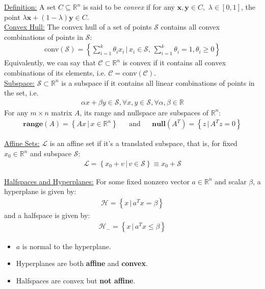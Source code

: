 \documentclass{article}
\newcommand{\sheader}[1]{\underline{#1:}}
\newcommand{\gap}{\medskip\\}
\newcommand{\curly}[1]{\left\{#1\right\}}
\begin{document}
\sheader{Definition} A set $C \subseteq \mathbb{R}^n$ is said to be \textit{convex} if for 
any $\mathbf{x}, \mathbf{y} \in C,\,\, \lambda \in [0, 1]$, the point 
$\lambda \mathbf{x} + (1-\lambda)\mathbf{y}\in C$.
\gap
\sheader{Convex Hull} The convex hull of a set of points $\mathcal{S}$
contains all convex combinations of points in $\mathcal{S}$:
\begin{align*}
    \textrm{conv}(\mathcal{S}) = \curly{\sum_{i=1}^k \theta_i x_i \,|\, x_i \in \mathcal{S}, \, \sum_{i = 1}^k \theta_i = 1, \theta_i \geq 0}
\end{align*}
Equivalently, we can say that $\mathcal{C} \subset \mathbb{R}^n$ is 
convex if it contains all convex combinations of its elements, i.e. 
$\mathcal{C} = \textrm{conv}(\mathcal{C})$.
\gap
\sheader{Subspace} $\mathcal{S} \subset \mathbb{R}^n$ is a subspace 
if it contains all linear combinations of points in the set, i.e.
\begin{align*}
    \alpha x + \beta y \in \mathcal{S}, \forall x, y \in \mathcal{S}, \forall \alpha, \beta \in \mathbb{R}
\end{align*}
For any $m \times n$ matrix $A$, its range and nullspace are 
subspaces of $\mathbb{R}^n$:
\begin{align*}
    \textbf{range}(A) = \curly{Ax \,|\, x \in \mathbb{R}^n} && \textrm{and} &&
    \textbf{null}(A^T) = \curly{z \,|\, A^Tz = 0}
\end{align*}

\sheader{Affine Sets} $\mathcal{L}$ is an affine set if it's a translated 
subspace, that is, for fixed $x_0 \in \mathbb{R}^n$ and subspace $\mathcal{S}$:
\begin{align*}
    \mathcal{L}= \curly{x_0 + v \,|\, v \in \mathcal{S}} \equiv x_0 + \mathcal{S}
\end{align*}

\sheader{Halfspaces and Hyperplanes} For some fixed nonzero vector
$a \in \mathbb{R}^n$ and scalar $\beta$, a hyperplane is given by:
\begin{align*}
    \mathcal{H} = \curly{x \,|\, a^Tx = \beta}
\end{align*}
and a halfspace is given by:
\begin{align*}
    \mathcal{H}_- = \curly{x \,|\, a^Tx \leq \beta}
\end{align*}
\begin{itemize}
    \item $a$ is normal to the hyperplane.
    \item Hyperplanes are both \textbf{affine} and \textbf{convex}.
    \item Halfspaces are convex but \textbf{not affine}.
\end{itemize}
\end{document}
